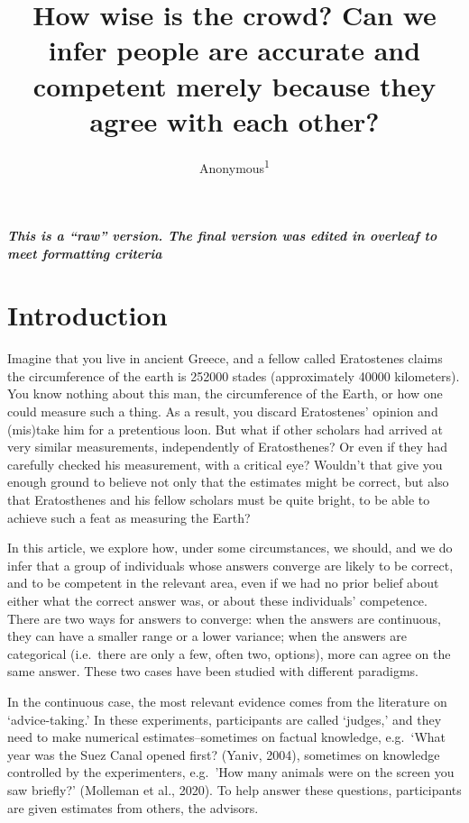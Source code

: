 \documentclass[
  doc,floatsintext]{apa6}
\title{How wise is the crowd?
Can we infer people are accurate and competent merely because they agree with each other?}
\author{Anonymous\textsuperscript{1}}
\date{}
\affiliation{\vspace{0.5cm}\textsuperscript{1} }
\begin{document}
\maketitle

\textbf{\emph{This is a ``raw'' version. The final version was edited in overleaf to meet formatting criteria}}

\hypertarget{introduction}{%
\section{Introduction}\label{introduction}}

Imagine that you live in ancient Greece, and a fellow called Eratostenes claims the circumference of the earth is 252000 stades (approximately 40000 kilometers). You know nothing about this man, the circumference of the Earth, or how one could measure such a thing. As a result, you discard Eratostenes' opinion and (mis)take him for a pretentious loon. But what if other scholars had arrived at very similar measurements, independently of Eratosthenes? Or even if they had carefully checked his measurement, with a critical eye? Wouldn't that give you enough ground to believe not only that the estimates might be correct, but also that Eratosthenes and his fellow scholars must be quite bright, to be able to achieve such a feat as measuring the Earth?

In this article, we explore how, under some circumstances, we should, and we do infer that a group of individuals whose answers converge are likely to be correct, and to be competent in the relevant area, even if we had no prior belief about either what the correct answer was, or about these individuals' competence. There are two ways for answers to converge: when the answers are continuous, they can have a smaller range or a lower variance; when the answers are categorical (i.e.~there are only a few, often two, options), more can agree on the same answer. These two cases have been studied with different paradigms.

In the continuous case, the most relevant evidence comes from the literature on `advice-taking.' In these experiments, participants are called `judges,' and they need to make numerical estimates--sometimes on factual knowledge, e.g.~`What year was the Suez Canal opened first? (Yaniv, 2004), sometimes on knowledge controlled by the experimenters, e.g.~'How many animals were on the screen you saw briefly?' (Molleman et al., 2020). To help answer these questions, participants are given estimates from others, the advisors.
\end{document}
